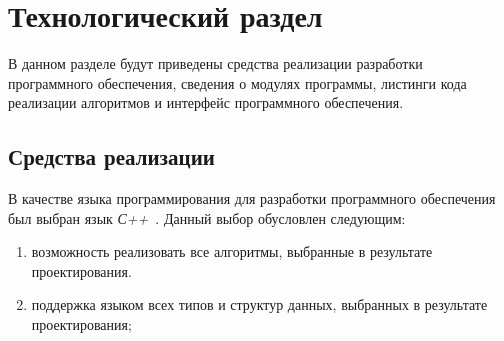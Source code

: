 \chapter{Технологический раздел}

В данном разделе будут приведены средства реализации разработки программного обеспечения, сведения о модулях программы, листинги кода реализации алгоритмов и интерфейс программного обеспечения.

\section{Средства реализации}

В качестве языка программирования для разработки программного обеспечения был выбран язык \textit{С++}~\cite{cplusplus}.
Данный выбор обусловлен следующим: 
\begin{enumerate}
	\item возможность реализовать все алгоритмы, выбранные в результате проектирования.
	\item поддержка языком всех типов и структур данных, выбранных в результате
	проектирования;
\end{enumerate}

